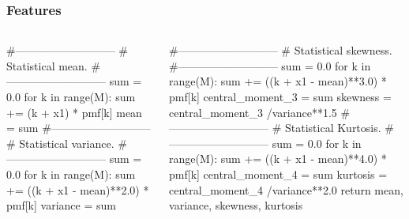 \begin{frame}[fragile]
    \frametitle{Features}
\begin{columns}
    \begin{roundedcodebox}
    \begin{python}  
    #---------------------------
    # Statistical mean.
    #---------------------------
    sum = 0.0
    for k in range(M):    
         sum +=  (k + x1) * pmf[k]
    mean = sum
    #---------------------------
    # Statistical variance.
    #---------------------------
    sum = 0.0
    for k in range(M):    
         sum +=  ((k + x1 - mean)**2.0) * pmf[k]
    variance = sum    
\end{python}
\end{roundedcodebox}
    \begin{roundedcodebox}
    \begin{python}  
    #---------------------------
    # Statistical skewness.
    #---------------------------
    sum = 0.0
    for k in range(M):    
         sum +=  ((k + x1 - mean)**3.0) * pmf[k]
    central_moment_3 = sum 
    skewness = central_moment_3 /variance**1.5       
    #---------------------------
    # Statistical Kurtosis.
    #---------------------------
    sum = 0.0
    for k in range(M):    
         sum +=  ((k + x1 - mean)**4.0) * pmf[k]
    central_moment_4 = sum 
    kurtosis = central_moment_4 /variance**2.0              
    return mean, variance, skewness, kurtosis   

\end{python}
\end{roundedcodebox}
    \end{columns}
\end{frame}


